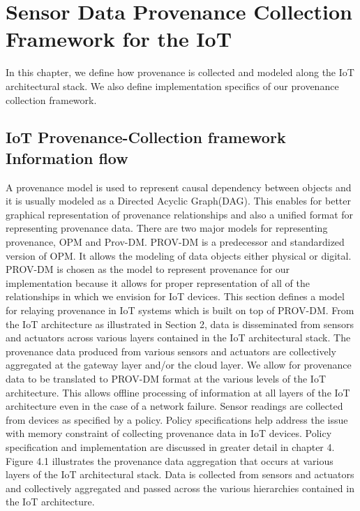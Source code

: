 
\chapter{Sensor Data Provenance Collection Framework for the IoT}

In this chapter, we define how provenance is collected and modeled along the IoT architectural stack. We also define implementation specifics of our provenance collection framework. 

\section{IoT Provenance-Collection framework Information flow}
%

A provenance model is used to represent causal dependency between objects and it is usually modeled as a Directed Acyclic Graph(DAG). This enables for better graphical representation of provenance relationships and also a unified format for representing provenance data. There are two major models for representing provenance, OPM and Prov-DM. PROV-DM is a predecessor and standardized version of OPM. It allows the modeling of data objects either physical or digital. PROV-DM is chosen as the model to represent provenance for our implementation because it allows for proper representation of all of the relationships in which we envision for IoT devices. This section defines a model for relaying provenance in IoT systems which is built on top of PROV-DM. 
From the IoT architecture as illustrated in Section 2, data is disseminated from sensors and actuators across various layers contained in the IoT architectural stack. The provenance data produced from various sensors and actuators are collectively aggregated at the gateway layer and/or the cloud layer. We allow for provenance data to be translated to PROV-DM format at the various levels of the IoT architecture. This allows offline processing of information at all layers of the IoT architecture even in the case of a network failure. Sensor readings are collected from devices as specified by a policy. Policy specifications help address the issue with memory constraint  of collecting provenance data in IoT devices. Policy specification and implementation are discussed in greater detail in chapter 4.  Figure 4.1 illustrates the provenance data aggregation that occurs at various layers of the IoT architectural stack. Data is collected from sensors and actuators and collectively aggregated and passed across the various hierarchies contained in the IoT architecture. 


